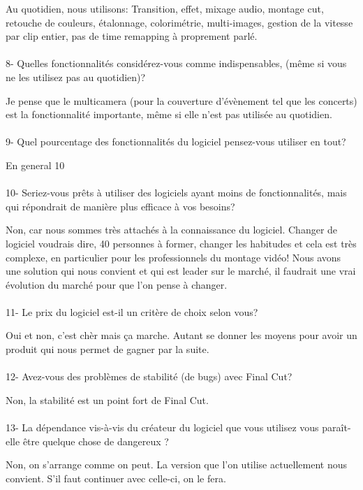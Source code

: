 Au quotidien, nous utilisons: Transition, effet, mixage audio, montage cut,
retouche de couleurs, étalonnage, colorimétrie, multi-images, gestion de la
vitesse par clip entier, pas de time remapping à proprement parlé.

\paragraph{}
8-  Quelles fonctionnalités considérez-vous comme indispensables, (même si vous
ne les utilisez pas au quotidien)?

Je pense que le multicamera (pour la couverture d'évènement tel que les
concerts) est la fonctionnalité importante, même si elle n'est pas utilisée au quotidien.

\paragraph{}
9- Quel pourcentage des fonctionnalités du logiciel pensez-vous utiliser
en tout?

En general 10%

\paragraph{}
10- Seriez-vous prêts à utiliser des logiciels ayant moins de
fonctionnalités, mais qui répondrait de manière plus efficace
à vos besoins?

Non, car nous sommes très attachés à la connaissance du logiciel.
Changer de logiciel voudrais dire, 40 personnes à former, changer les
habitudes et cela est très complexe, en particulier pour les professionnels
du montage vidéo! Nous avons une solution qui nous convient et qui est leader
sur le marché, il faudrait une vrai évolution du marché pour que l'on pense à
changer.

\paragraph{}
11-  Le prix du logiciel est-il un critère de choix selon vous?

Oui et non, c'est chèr mais ça marche. Autant se donner les moyens pour avoir
un produit qui nous permet de gagner par la suite.

\paragraph{}
12- Avez-vous des problèmes de stabilité (de bugs) avec Final Cut?

Non, la stabilité est un point fort de Final Cut.

\paragraph{}
13- La dépendance vis-à-vis du créateur du logiciel que vous utilisez
vous paraît-elle être quelque chose de dangereux ?

Non, on s'arrange comme on peut. La version que l'on utilise actuellement
nous convient. S'il faut continuer avec celle-ci, on le fera.
